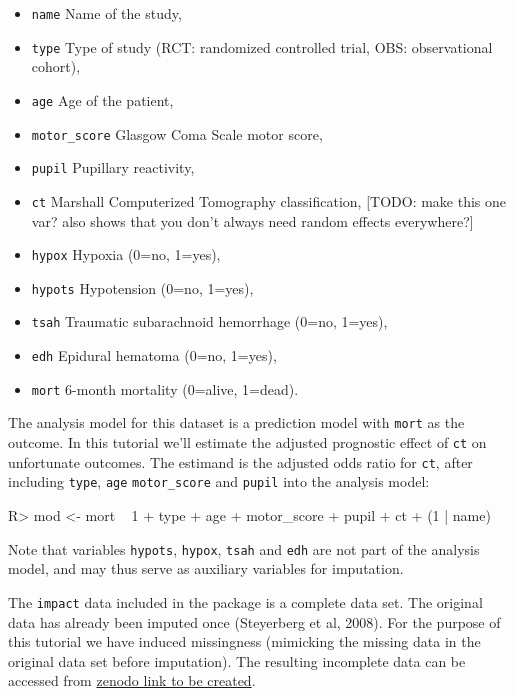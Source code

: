 \documentclass[
]{jss}
\providecommand{\tightlist}{%
  \setlength{\itemsep}{0pt}\setlength{\parskip}{0pt}}
\begin{document}
\begin{itemize}
\tightlist
\item
  \texttt{name} Name of the study,
\item
  \texttt{type} Type of study (RCT: randomized controlled trial, OBS:
  observational cohort),
\item
  \texttt{age} Age of the patient,
\item
  \texttt{motor\_score} Glasgow Coma Scale motor score,
\item
  \texttt{pupil} Pupillary reactivity,
\item
  \texttt{ct} Marshall Computerized Tomography classification, {[}TODO:
  make this one var? also shows that you don't always need random
  effects everywhere?{]}
\item
  \texttt{hypox} Hypoxia (0=no, 1=yes),
\item
  \texttt{hypots} Hypotension (0=no, 1=yes),
\item
  \texttt{tsah} Traumatic subarachnoid hemorrhage (0=no, 1=yes),
\item
  \texttt{edh} Epidural hematoma (0=no, 1=yes),
\item
  \texttt{mort} 6-month mortality (0=alive, 1=dead).
\end{itemize}

The analysis model for this dataset is a prediction model with
\texttt{mort} as the outcome. In this tutorial we'll estimate the
adjusted prognostic effect of \texttt{ct} on unfortunate outcomes. The
estimand is the adjusted odds ratio for \texttt{ct}, after including
\texttt{type}, \texttt{age} \texttt{motor\_score} and \texttt{pupil}
into the analysis model:

\begin{CodeChunk}
\begin{CodeInput}
R> mod <- mort ~ 1 + type + age + motor_score + pupil + ct + (1 | name) 
\end{CodeInput}
\end{CodeChunk}

Note that variables \texttt{hypots}, \texttt{hypox}, \texttt{tsah} and
\texttt{edh} are not part of the analysis model, and may thus serve as
auxiliary variables for imputation.

The \texttt{impact} data included in the  package is a
complete data set. The original data has already been imputed once
(Steyerberg et al, 2008). For the purpose of this tutorial we have
induced missingness (mimicking the missing data in the original data set
before imputation). The resulting incomplete data can be accessed from
\href{https://zenodo.com}{zenodo link to be created}.
\end{document}
